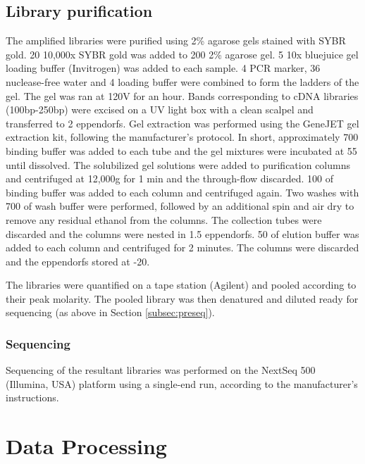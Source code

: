 \subsection{Library purification}
The amplified libraries were purified using 2\% agarose gels stained with SYBR gold.
20\ul{} 10,000x SYBR gold was added to 200\ml{} 2\% agarose gel.
5\ul{} 10x bluejuice gel loading buffer (Invitrogen) was added to each sample.
4\ul{} PCR marker, 36\ul{} nuclease-free water and 4\ul{} loading buffer were combined to form the ladders of the gel.
The gel was ran at 120V for an hour.
Bands corresponding to cDNA libraries (100bp-250bp) were excised on a UV light box with a clean scalpel and transferred to 2\ml{} eppendorfs.
Gel extraction was performed using the GeneJET gel extraction kit, following the manufacturer's protocol.
In short, approximately 700\ul{} binding buffer was added to each tube and the gel mixtures were incubated at 55\C{} until dissolved.
The solubilized gel solutions were added to purification columns and centrifuged at 12,000g for 1 min and the through-flow discarded.
100\ul{} of binding buffer was added to each column and centrifuged again.
Two washes with 700\ul{} of wash buffer were performed, followed by an additional spin and air dry to remove any residual ethanol from the columns.
The collection tubes were discarded and the columns were nested in 1.5\ml{} eppendorfs.
50\ul{} of elution buffer was added to each column and centrifuged for 2 minutes.
The columns were discarded and the eppendorfs stored at -20\C{}.

The libraries were quantified on a tape station (Agilent) and pooled according to their peak molarity.
The pooled library was then denatured and diluted ready for sequencing (as above in Section \ref{subsec:preseq}).


\subsubsection{Sequencing}
Sequencing of the resultant libraries was performed on the NextSeq 500 (Illumina, USA) platform using a single-end run, according to the manufacturer's instructions.

%

\section{Data Processing}\label{sec:data_processing}
